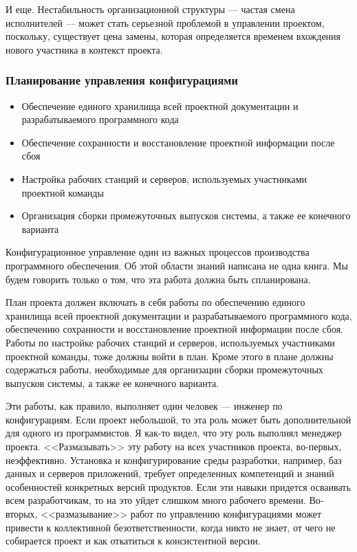 \documentclass{../industrial-development}
\begin{document}
    И еще. Нестабильность организационной структуры — частая смена исполнителей — может стать серьезной проблемой в управлении проектом, поскольку, существует цена замены, которая определяется временем вхождения нового участника в контекст проекта.

    \begin{frame} \frametitle{Планирование управления конфигурациями}
        \begin{itemize}
            \item Обеспечение единого хранилища всей проектной документации и разрабатываемого программного кода
            \item Обеспечение сохранности и восстановление проектной информации после сбоя
            \item Настройка рабочих станций и серверов, используемых участниками проектной команды
            \item Организация сборки промежуточных выпусков системы, а также ее конечного варианта
        \end{itemize}
    \end{frame}
    \lecturenotes
Конфигурационное управление один из важных процессов производства программного обеспечения. Об этой области знаний написана не одна книга. Мы будем говорить только о том, что эта работа должна быть спланирована.

План проекта должен включать в себя работы по обеспечению единого хранилища всей проектной документации и разрабатываемого программного кода, обеспечению сохранности и восстановление проектной информации после сбоя. Работы по настройке рабочих станций и серверов, используемых участниками проектной команды, тоже должны войти в план. Кроме этого в плане должны содержаться работы, необходимые для организации сборки промежуточных выпусков системы, а также ее конечного варианта.

Эти работы, как правило, выполняет один человек — инженер по конфигурациям. Если проект небольшой, то эта роль может быть дополнительной для одного из программистов. Я как-то видел, что эту роль выполнял менеджер проекта. <<Размазывать>> эту работу на всех участников проекта, во-первых, неэффективно. Установка и конфигурирование среды разработки, например, баз данных и серверов приложений, требует определенных компетенций и знаний особенностей конкретных версий продуктов. Если эти навыки придется осваивать всем разработчикам, то на это уйдет слишком много рабочего времени. Во-вторых, <<размазывание>> работ по управлению конфигурациями может привести к коллективной безответственности, когда никто не знает, от чего не собирается проект и как откатиться к консистентной версии.
\end{document}
